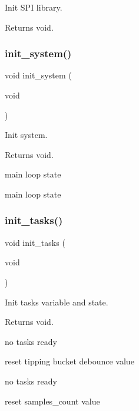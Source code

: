 Init S\+PI library. 

\begin{DoxyReturn}{Returns}
void. 
\end{DoxyReturn}
\mbox{\label{rmap_8ino_afceb890a6ab9be73cc5481369538c705}} 
\subsubsection{\texorpdfstring{init\+\_\+system()}{init\_system()}}
{\footnotesize\ttfamily void init\+\_\+system (\begin{DoxyParamCaption}\item[{void}]{ }\end{DoxyParamCaption})}



Init system. 

\begin{DoxyReturn}{Returns}
void. 
\end{DoxyReturn}
main loop state

main loop state \mbox{\label{rmap_8ino_ab4bf0a3d77da083f131d3fa35a37d2b1}} 
\subsubsection{\texorpdfstring{init\+\_\+tasks()}{init\_tasks()}}
{\footnotesize\ttfamily void init\+\_\+tasks (\begin{DoxyParamCaption}\item[{void}]{ }\end{DoxyParamCaption})}



Init tasks variable and state. 

\begin{DoxyReturn}{Returns}
void. 
\end{DoxyReturn}
no tasks ready

reset tipping bucket debounce value

no tasks ready

reset samples\+\_\+count value \mbox{\label{rmap_8ino_a980e73df66b14b1190bc25da430a4f12}} 
